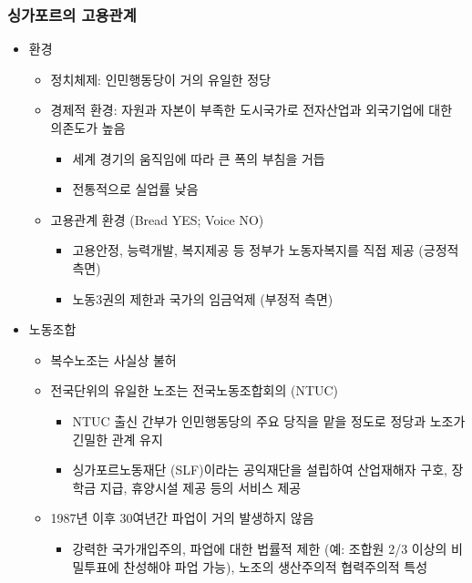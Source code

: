 \documentclass[aspectratio=169,xcolor=dvipsnames,handout]{beamer}
\begin{document}
\begin{frame}[allowframebreaks]
    \frametitle{싱가포르의 고용관계}
    \begin{itemize}[<+->]
        \item 환경
        \begin{itemize}
            \item 정치체제: 인민행동당이 거의 유일한 정당
            \item 경제적 환경: 자원과 자본이 부족한 도시국가로 전자산업과 외국기업에 대한 의존도가 높음
                \begin{itemize}
                    \item 세계 경기의 움직임에 따라  큰 폭의 부침을 거듭
                    \item 전통적으로 실업률 낮음
                \end{itemize}
            \item 고용관계 환경  (Bread YES\@; Voice NO)
                \begin{itemize}
                    \item 고용안정, 능력개발, 복지제공 등 정부가 노동자복지를 직접 제공 (긍정적 측면)
                    \item 노동3권의 제한과 국가의 임금억제 (부정적 측면) 
                \end{itemize}
        \end{itemize}
    \framebreak%
        \item 노동조합
        \begin{itemize}
            \item 복수노조는 사실상 불허
            \item 전국단위의 유일한 노조는 전국노동조합회의 (NTUC)
            \begin{itemize}
                \item NTUC 출신 간부가 인민행동당의 주요 당직을 맡을 정도로 정당과 노조가 긴밀한 관계 유지
                \item 싱가포르노동재단 (SLF)이라는 공익재단을 설립하여 산업재해자 구호, 장학금 지급, 휴양시설 제공 등의 서비스 제공  
            \end{itemize}
            \item 1987년 이후 30여년간 파업이 거의 발생하지 않음
            \begin{itemize}
                \item 강력한 국가개입주의, 파업에 대한 법률적 제한 (예: 조합원 2/3 이상의 비밀투표에 찬성해야 파업 가능), 노조의 생산주의적 협력주의적 특성
            \end{itemize}

\end{itemize}
\end{itemize}
\end{frame}
\end{document}
